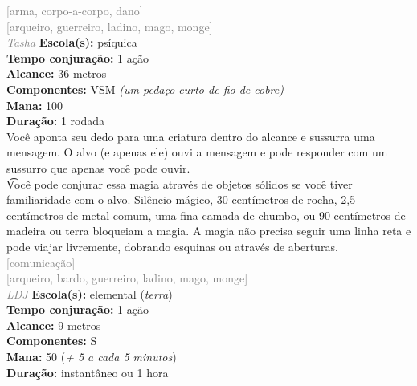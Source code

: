 \documentclass{RPG_Adventure}[2021/10/20]
\begin{document}
{\scriptsize \textcolor{gray}{[arma, corpo-a-corpo, dano]\\}}
{\scriptsize \textcolor{gray}{[arqueiro, guerreiro, ladino, mago, monge]\\}}
{\tiny \textcolor{gray}{\textit{Tasha}}}\jump{}
{\small \t \textbf{Escola(s):} psíquica\\\t \textbf{Tempo conjuração:} 1 ação\\\t \textbf{Alcance:} 36 metros\\\t \textbf{Componentes:} VSM \textit{(um pedaço curto de fio de cobre)}\\\t \textbf{Mana:} 100\\\t \textbf{Duração:} 1 rodada\\}
{\normalsize Você aponta seu dedo para uma criatura dentro do alcance e sussurra uma mensagem. O alvo (e apenas ele) ouvi a mensagem e pode responder com um sussurro que apenas você pode ouvir.\\\t Você pode conjurar essa magia através de objetos sólidos se você tiver familiaridade com o alvo. Silêncio mágico, 30 centímetros de rocha, 2,5 centímetros de metal comum, uma fina camada de chumbo, ou 90 centímetros de madeira ou terra bloqueiam a magia. A magia não precisa seguir uma linha reta e pode viajar livremente, dobrando esquinas ou através de aberturas.\\}
{\scriptsize \textcolor{gray}{[comunicação]\\}}
{\scriptsize \textcolor{gray}{[arqueiro, bardo, guerreiro, ladino, mago, monge]\\}}
{\tiny \textcolor{gray}{\textit{LDJ}}}\jump{}
{\small \t \textbf{Escola(s):} elemental (\textit{terra})\\\t \textbf{Tempo conjuração:} 1 ação\\\t \textbf{Alcance:} 9 metros\\\t \textbf{Componentes:} S\\\t \textbf{Mana:} 50 (\textit{+ 5 a cada 5 minutos})\\\t \textbf{Duração:} instantâneo ou 1 hora\\}
\end{document}
